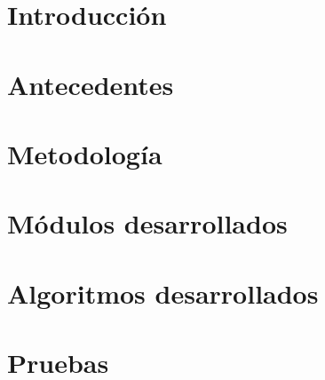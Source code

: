 \documentclass[10pt]{book}
\begin{document}

\thispagestyle{empty}



\frontmatter
\tableofcontents
\listoffigures
\mainmatter

 \hideControlVersion

\chapter{Introducción}\label{chp:introduccion}
\hypertarget{chp:introduccion}{}

\chapter{Antecedentes}\label{chp:introduccion}
\hypertarget{chp:antecedentes}{}

\chapter{Metodología}\label{chp:metodologia} 
\hypertarget{chp:metodologia}{}

\chapter{Módulos desarrollados}\label{chp:modulosDesarrollados} 
\hypertarget{chp:modulosDesarrollados}{}

\chapter{Algoritmos desarrollados}\label{chp:algoritmosDesarrollados} 
\hypertarget{chp:algoritmosDesarrollados}{}

\chapter{Pruebas}\label{chp:pruebas} 
\hypertarget{chp:pruebas}{}
\end{document}
